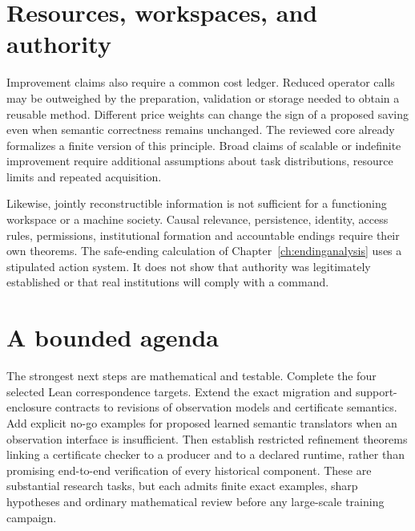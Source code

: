 \section{Resources, workspaces, and authority}
Improvement claims also require a common cost ledger. Reduced operator calls may be outweighed by the preparation, validation or storage needed to obtain a reusable method. Different price weights can change the sign of a proposed saving even when semantic correctness remains unchanged. The reviewed core already formalizes a finite version of this principle. Broad claims of scalable or indefinite improvement require additional assumptions about task distributions, resource limits and repeated acquisition.

Likewise, jointly reconstructible information is not sufficient for a functioning workspace or a machine society. Causal relevance, persistence, identity, access rules, permissions, institutional formation and accountable endings require their own theorems. The safe-ending calculation of Chapter~\ref{ch:endinganalysis} uses a stipulated action system. It does not show that authority was legitimately established or that real institutions will comply with a command.

\section{A bounded agenda}
The strongest next steps are mathematical and testable. Complete the four selected Lean correspondence targets. Extend the exact migration and support-enclosure contracts to revisions of observation models and certificate semantics. Add explicit no-go examples for proposed learned semantic translators when an observation interface is insufficient. Then establish restricted refinement theorems linking a certificate checker to a producer and to a declared runtime, rather than promising end-to-end verification of every historical component. These are substantial research tasks, but each admits finite exact examples, sharp hypotheses and ordinary mathematical review before any large-scale training campaign.
